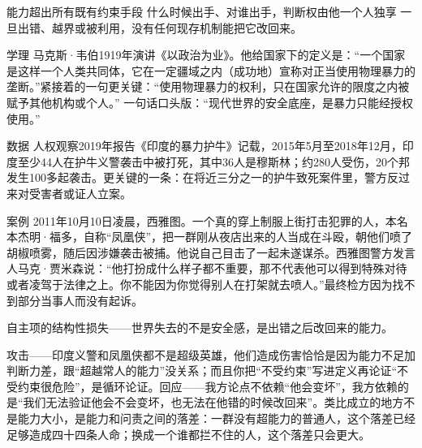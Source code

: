 \documentclass[prep,both]{debate}
\begin{document}
\begin{fields}
\begin{mechanism}[机制]
\step 能力超出所有既有约束手段
\step 什么时候出手、对谁出手，判断权由他一个人独享
\step 一旦出错、越界或被利用，没有任何现存机制能把它改回来。

\end{mechanism}
\begin{evidence}{学理}
马克斯·韦伯1919年演讲《以政治为业》。他给国家下的定义是：“一个国家是这样一个人类共同体，它在一定疆域之内（成功地）宣称对正当使用物理暴力的垄断。”紧接着的一句更关键：“使用物理暴力的权利，只在国家允许的限度之内被赋予其他机构或个人。” 一句话口头版：“现代世界的安全底座，是暴力只能经授权使用。”
\end{evidence}
\begin{evidence}{数据}
人权观察2019年报告《印度的暴力护牛》记载，2015年5月至2018年12月，印度至少44人在护牛义警袭击中被打死，其中36人是穆斯林；约280人受伤，20个邦发生100多起袭击。更关键的一条：在将近三分之一的护牛致死案件里，警方反过来对受害者或证人立案。
\end{evidence}
\begin{evidence}{案例}
2011年10月10日凌晨，西雅图。一个真的穿上制服上街打击犯罪的人，本名本杰明·福多，自称“凤凰侠”，把一群刚从夜店出来的人当成在斗殴，朝他们喷了胡椒喷雾，随后因涉嫌袭击被捕。他说自己目击了一起未遂谋杀。西雅图警方发言人马克·贾米森说：“他打扮成什么样子都不重要，那不代表他可以得到特殊对待或者凌驾于法律之上。你不能因为你觉得别人在打架就去喷人。”最终检方因为找不到部分当事人而没有起诉。
\end{evidence}
\closing[回扣判准]{自主项的结构性损失——世界失去的不是安全感，是出错之后改回来的能力。}
\begin{clash}
攻击——印度义警和凤凰侠都不是超级英雄，他们造成伤害恰恰是因为能力不足加判断力差，跟“超越常人的能力”没关系；而且你把“不受约束”写进定义再论证“不受约束很危险”，是循环论证。回应——我方论点不依赖“他会变坏”，我方依赖的是“我们无法验证他会不会变坏，也无法在他错的时候改回来”。类比成立的地方不是能力大小，是能力和问责之间的落差：一群没有超能力的普通人，这个落差已经足够造成四十四条人命；换成一个谁都拦不住的人，这个落差只会更大。
\end{clash}
\end{fields}
\end{document}
